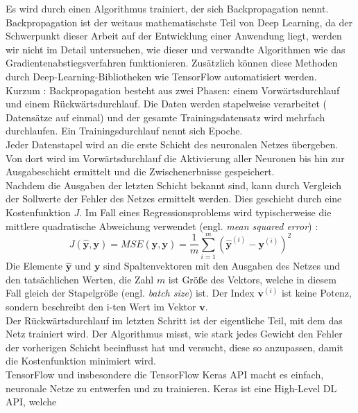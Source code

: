 Es wird durch einen Algorithmus trainiert, der
sich Backpropagation nennt.
Backpropagation ist der weitaus mathematischste Teil von
Deep Learning, da der Schwerpunkt dieser Arbeit auf der Entwicklung einer
Anwendung liegt, werden wir nicht im Detail untersuchen,
wie dieser und verwandte Algorithmen wie das Gradientenabstiegsverfahren
funktionieren. Zusätzlich können diese Methoden durch Deep-Learning-Bibliotheken
wie TensorFlow automatisiert werden.\\[8pt]
Kurzum \parencite[290-291]{book:hands-on-ml}:
Backpropagation besteht aus zwei Phasen: einem Vorwärtsdurchlauf
und einem Rückwärtsdurchlauf. Die Daten werden stapelweise verarbeitet
( Datensätze auf ein­mal) und der gesamte Trainingsdatensatz
wird mehrfach durchlaufen. Ein Trainingsdurchlauf nennt sich Epoche.\\[4pt]
Jeder Datenstapel wird an die erste Schicht des neuronalen Netzes
übergeben. Von dort wird im Vorwärtsdurchlauf die Aktivierung aller
Neuronen bis hin zur Ausgabeschicht ermittelt und die Zwischenerbnisse gespeichert.\\[4pt]
Nachdem die Ausgaben der letzten Schicht bekannt sind, kann
durch Vergleich der Sollwerte der Fehler des Netzes ermittelt werden.
Dies geschieht durch eine Kostenfunktion $J$. Im Fall eines Regressionsproblems
wird typischerweise die mittlere quadratische Abweichung verwendet
(engl. \textit{mean squared error}) \parencite[113-114]{book:hands-on-ml}:
\begin{equation}
  J(\mathbf{\hat{y}}, \mathbf{y}) =
  MSE(\mathbf{\hat{y}}, \mathbf{y}) =
    \frac{1}{m} \sum_{i=1}^{m} (\mathbf{\hat{y}}^{(i)} - \mathbf{y}^{(i)})^2
\end{equation}
Die Elemente $\mathbf{\hat{y}}$ und $\mathbf{y}$ sind Spaltenvektoren
mit den Ausgaben des Netzes und den tatsächlichen Werten, die Zahl $m$
ist Größe des Vektors, welche in diesem Fall gleich der Stapelgröße
(engl. \textit{batch size}) ist. Der Index $\mathbf{v}^{(i)}$ ist keine Potenz,
sondern beschreibt den i-ten Wert im Vektor $\mathbf{v}$.\\[4pt]
Der Rückwärtsdurchlauf im letzten Schritt ist der eigentliche Teil, mit dem das Netz
trainiert wird. Der Algorithmus misst, wie stark jedes Gewicht den Fehler der
vorherigen Schicht beeinflusst hat und versucht, diese so anzupassen,
damit die Kostenfunktion minimiert wird.\\[8pt]
TensorFlow und insbesondere die TensorFlow Keras API
macht es einfach, neuronale Netze zu entwerfen und zu trainieren.
Keras ist eine High-Level DL API, welche
